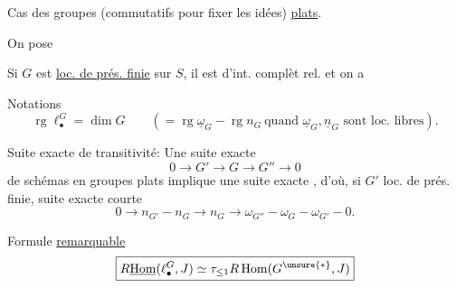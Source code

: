Cas des groupes (commutatifs pour fixer les idées) \uline{plats}.

On pose

Si $G$ est \uline{loc. de prés. finie} sur $S$, il est d'int. complèt rel. et on a

Notations
\[
\operatorname{rg}\ell_\bullet^G=\dim G\qquad(=\operatorname{rg}\underline\omega_G-\operatorname{rg}n_G\ \text{quand }\underline\omega_G,\underline n_G\text{ sont loc. libres}).
\]

Suite exacte de transitivité: Une suite exacte
\[
0\longrightarrow G'\longrightarrow G\longrightarrow G''\longrightarrow0
\]
de schémas en groupes plats implique une suite exacte
,
d'où, si $G'$ loc. de prés. finie, suite exacte courte
\[
0\longrightarrow n_{G'}-n_G\longrightarrow n_G\longrightarrow\omega_{G''}-\omega_G-\omega_{G'}-0.
\]

Formule \uline{remarquable}
\[
\boxed{R\underline{\operatorname{Hom}}(\ell_\bullet^G,J)\simeq\tau_{\leq1}R\operatorname{Hom}(G^{\unsure{*}},J)}
\]
